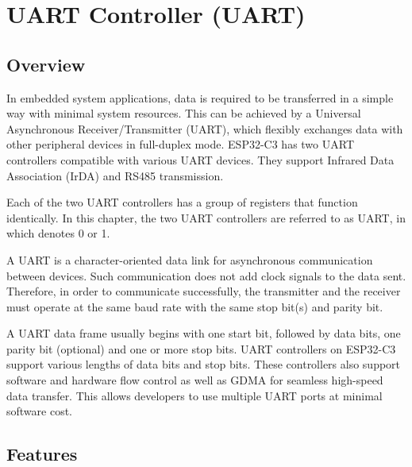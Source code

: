 \documentclass[main\_\_EN.tex]{subfiles}
\begin{document}

\ifglobal
\else
    {\let\clearpage\relax \listoftodos}
    \tableofcontents
\fi



\hypertarget{uart}{}
\chapter{UART Controller (UART)}
\label{mod:uart}


\section{Overview}

In embedded system applications, data is required to be transferred in a simple way with minimal system resources. This can be achieved by a Universal Asynchronous Receiver/Transmitter (UART), which flexibly exchanges data with other peripheral devices in full-duplex mode. ESP32-C3 has two UART controllers compatible with various UART devices. They support Infrared Data Association (IrDA) and RS485 transmission.

Each of the two UART controllers has a group of registers that function identically. In this chapter, the two UART controllers are referred to as UART, in which  denotes 0 or 1.

A UART is a character-oriented data link for asynchronous communication between devices. Such communication does not add clock signals to the data sent. Therefore, in order to communicate successfully, the transmitter and the receiver must operate at the same baud rate with the same stop bit(s) and parity bit.

A UART data frame usually begins with one start bit, followed by data bits, one parity bit (optional) and one or more stop bits. UART controllers on ESP32-C3 support various lengths of data bits and stop bits. These controllers also support software and hardware flow control as well as GDMA for seamless high-speed data transfer. This allows developers to use multiple UART ports at minimal software cost.

\section{Features}
\end{document}
